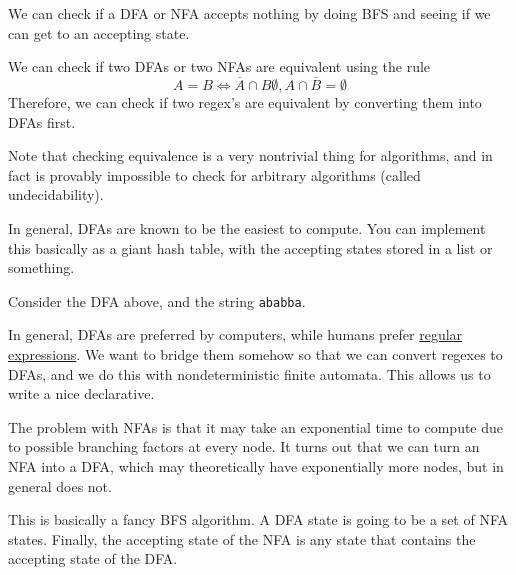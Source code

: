   \begin{theorem}
    \label{thm:accepting-nothing}
    We can check if a DFA or NFA accepts nothing by doing BFS and seeing if we can get to an accepting state. 
  \end{theorem}

  \begin{theorem}
    \label{thm:equivalence-of-nfa-dfas}
    We can check if two DFAs or two NFAs are equivalent using the rule 
    \begin{equation}
      A = B \iff \overline{A} \cap B \emptyset, A \cap \overline{B} = \emptyset
    \end{equation}
    Therefore, we can check if two regex's are equivalent by converting them into DFAs first. 
  \end{theorem}

  Note that checking equivalence is a very nontrivial thing for algorithms, and in fact is provably impossible to check for arbitrary algorithms (called undecidability). 

  In general, DFAs are known to be the easiest to compute. You can implement this basically as a giant hash table, with the accepting states stored in a list or something. 

  \begin{example}
    \label{ex:computing-a-dfa}
    Consider the DFA above, and the string \texttt{ababba}. 
  \end{example}

  In general, DFAs are preferred by computers, while humans prefer \hyperref[def:regular_expression]{regular expressions}. We want to bridge them somehow so that we can convert regexes to DFAs, and we do this with nondeterministic finite automata. This allows us to write a nice declarative. 

  The problem with NFAs is that it may take an exponential time to compute due to possible branching factors at every node. It turns out that we can turn an NFA into a DFA, which may theoretically have exponentially more nodes, but in general does not. 

  \begin{algo}
    This is basically a fancy BFS algorithm. A DFA state is going to be a set of NFA states. Finally, the accepting state of the NFA is any state that contains the accepting state of the DFA. 
  \end{algo}

